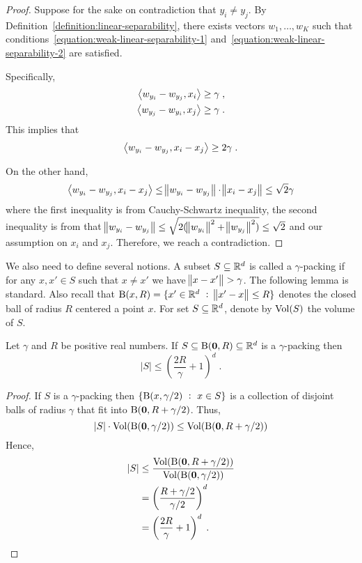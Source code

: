 \begin{proof}
Suppose for the sake on contradiction that $y_i \neq y_j$. By
Definition~\ref{definition:linear-separability}, there exists
vectors $w_1, \ldots, w_K$ such that
conditions~\eqref{equation:weak-linear-separability-1}
and~\eqref{equation:weak-linear-separability-2} are satisfied.

Specifically,
\begin{align*}
\left\langle w_{y_i} - w_{y_j}, x_i \right\rangle & \ge \gamma \; , \\
\left\langle w_{y_j} - w_{y_i}, x_j \right\rangle & \ge \gamma \; .
\end{align*}
This implies that
$$
\left\langle w_{y_i} - w_{y_j}, x_i - x_j \right\rangle \ge 2\gamma \; .
$$

On the other hand,
$$
\left\langle w_{y_i} - w_{y_j}, x_i - x_j \right\rangle \le \norm{w_{y_i} - w_{y_j}} \cdot \norm{x_i - x_j} \le \sqrt{2} \gamma
$$
where the first inequality is from Cauchy-Schwartz inequality, the second
inequality is from that $\norm{w_{y_i} - w_{y_j}} \le \sqrt{2(\norm{w_{y_i}}^2 +
\norm{w_{y_j}}^2)} \leq \sqrt{2}$ and our assumption on $x_i$ and $x_j$.
Therefore, we reach a contradiction.
\end{proof}

We also need to define several notions. A subset $S \subseteq \mathbb{R}^d$ is called a
$\gamma$-packing if for any $x,x' \in S$ such that $x \neq x'$ we have $\norm{x -
x'} > \gamma$. The following lemma is standard. Also recall that $\operatorname{B}(x,R) = \{ x'
\in \mathbb{R}^d ~:~ \norm{x' - x} \le R \}$ denotes the closed ball of radius $R$
centered a point $x$. For set $S \subseteq \mathbb{R}^d$, denote by $\operatorname*{Vol}(S)$ the volume of
$S$.

\begin{lemma}
\label{lemma:size-of-packing}
Let $\gamma$ and $R$ be positive real numbers.
If $S \subseteq \operatorname{B}(\mathbf{0},R) \subseteq \mathbb{R}^d$ is a $\gamma$-packing then
$$
|S| \le \left( \frac{2R}{\gamma} + 1 \right)^d \; .
$$
\end{lemma}

\begin{proof}
If $S$ is a $\gamma$-packing then $\{ \operatorname{B}(x,\gamma/2) ~:~ x \in S \}$
is a collection of disjoint balls of radius $\gamma$ that fit into $\operatorname{B}(\mathbf{0},R + \gamma/2)$.
Thus,
$$
|S| \cdot \operatorname*{Vol}(\operatorname{B}(\mathbf{0}, \gamma/2)) \le \operatorname*{Vol}(\operatorname{B}(\mathbf{0},R + \gamma/2))
$$
Hence,
\begin{align*}
|S|
& \le \frac{\operatorname*{Vol}(\operatorname{B}(\mathbf{0},R + \gamma/2))}{\operatorname*{Vol}(\operatorname{B}(\mathbf{0}, \gamma/2))} \\
& = \left( \frac{R + \gamma/2}{\gamma/2} \right)^d \\
& = \left( \frac{2R}{\gamma} + 1 \right)^d \; .
\end{align*}
\end{proof}

